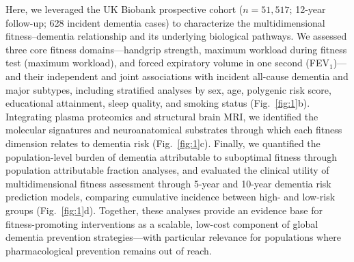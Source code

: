 \documentclass{article}
\begin{document}

Here, we leveraged the UK Biobank prospective cohort ($n = 51{,}517$; 12-year 
follow-up; 628 incident dementia cases) to characterize the multidimensional 
fitness--dementia relationship and its underlying biological pathways. We assessed 
three core fitness domains—handgrip strength, maximum workload during fitness test (maximum workload), and forced 
expiratory volume in one second (FEV$_1$)—and their independent and joint 
associations with incident all-cause dementia and major subtypes, including 
stratified analyses by sex, age, polygenic risk score, educational attainment, 
sleep quality, and smoking status (Fig.~\ref{fig:1}b). Integrating plasma 
proteomics and structural brain MRI, we identified the molecular signatures and 
neuroanatomical substrates through which each fitness dimension relates to dementia 
risk (Fig.~\ref{fig:1}c). Finally, we quantified the population-level burden of 
dementia attributable to suboptimal fitness through population attributable fraction 
analyses, and evaluated the clinical utility of multidimensional fitness assessment 
through 5-year and 10-year dementia risk prediction models, comparing cumulative 
incidence between high- and low-risk groups (Fig.~\ref{fig:1}d). Together, these 
analyses provide an evidence base for fitness-promoting interventions as a 
scalable, low-cost component of global dementia prevention strategies—with 
particular relevance for populations where pharmacological prevention remains 
out of reach.
\end{document}
